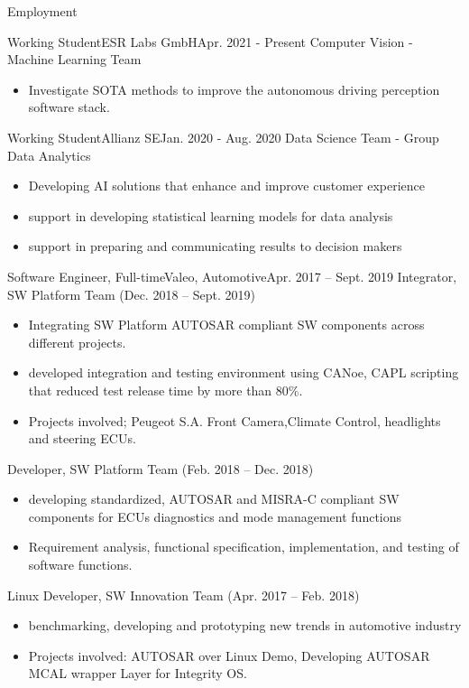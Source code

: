 \documentclass[]{mcdowellcv}
\begin{document}
	\begin{cvsection}{Employment}
		\begin{cvsubsection}{Working Student}{ESR Labs GmbH}{Apr. 2021 - Present}
			Computer Vision - Machine Learning Team			
			\begin{itemize}
				\item Investigate SOTA methods to improve the autonomous driving perception software stack.
			\end{itemize}
		\end{cvsubsection}
		\begin{cvsubsection}{Working Student}{Allianz SE}{Jan. 2020 -  Aug. 2020}
			Data Science Team - Group Data Analytics
			\begin{itemize}
				\item Developing AI solutions that enhance and improve customer experience
				\item support in developing statistical learning models for data analysis
				\item support in preparing and communicating results to decision makers
			\end{itemize}
		\end{cvsubsection}
		
		\begin{cvsubsection}{Software Engineer, Full-time}{Valeo, Automotive}{Apr. 2017 -- Sept. 2019}	
			Integrator, SW Platform Team (Dec. 2018 -- Sept. 2019)
			\begin{itemize}
				\item Integrating SW Platform AUTOSAR compliant SW components across different projects.
				\item developed integration and testing environment using CANoe, CAPL scripting that reduced test release time by more than 80\%.
				\item Projects involved; Peugeot S.A. Front Camera,Climate Control, headlights and steering ECUs.
			\end{itemize}
			Developer, SW Platform Team (Feb. 2018 -- Dec. 2018)
			\begin{itemize}
				\item developing standardized, AUTOSAR and MISRA-C compliant SW components for ECUs diagnostics and mode management functions
				\item Requirement analysis, functional specification, implementation, and testing of software functions.
			\end{itemize}
			Linux Developer, SW Innovation Team (Apr. 2017 -- Feb. 2018)
			\begin{itemize}
				\item benchmarking, developing and prototyping new trends in automotive industry 
				\item Projects involved: AUTOSAR over Linux Demo, Developing AUTOSAR MCAL wrapper Layer for Integrity OS.
			\end{itemize}
			

\end{cvsubsection}
\end{cvsection}
\end{document}
